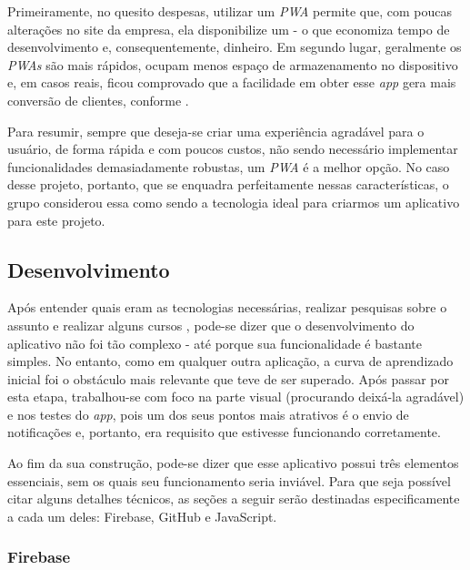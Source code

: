 Primeiramente, no quesito despesas, utilizar um \textit{PWA} permite que, com poucas alterações no site da empresa, ela disponibilize um  - o que economiza tempo de desenvolvimento e, consequentemente, dinheiro. Em segundo lugar, geralmente os \textit{PWAs} são mais rápidos, ocupam menos espaço de armazenamento no dispositivo e, em casos reais, ficou comprovado que a facilidade em obter esse \textit{app} gera mais conversão de clientes, conforme \cite{Souza19} .

Para resumir, sempre que deseja-se criar uma experiência agradável para o usuário, de forma rápida e com poucos custos, não sendo necessário implementar funcionalidades demasiadamente robustas, um \textit{PWA} é a melhor opção. No caso desse projeto, portanto, que se enquadra perfeitamente nessas características, o grupo considerou essa como sendo a tecnologia ideal para criarmos um aplicativo para este projeto.


\subsection{Desenvolvimento}
\label{subsec:desenvolvimento}

Após entender quais eram as tecnologias necessárias, realizar pesquisas sobre o assunto e realizar alguns cursos \online{}, pode-se dizer que o desenvolvimento do aplicativo não foi tão complexo - até porque sua funcionalidade é bastante simples. No entanto, como em qualquer outra aplicação, a curva de aprendizado inicial foi o obstáculo mais relevante que teve de ser superado. Após passar por esta etapa, trabalhou-se com foco na parte visual (procurando deixá-la agradável) e nos testes do \textit{app}, pois um dos seus pontos mais atrativos é o envio de notificações e, portanto, era requisito que estivesse funcionando corretamente. 

Ao fim da sua construção, pode-se dizer que esse aplicativo possui três elementos essenciais, sem os quais seu funcionamento seria inviável. Para que seja possível citar alguns detalhes técnicos, as seções a seguir serão destinadas especificamente a cada um deles: Firebase, GitHub e JavaScript.

\subsubsection{Firebase}
\label{subsubsec:firebase}

